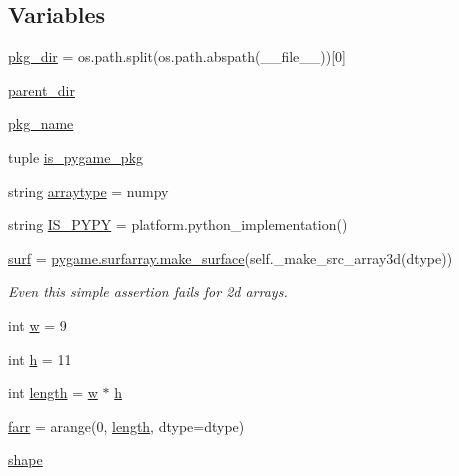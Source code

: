 \subsection*{Variables}
\begin{DoxyCompactItemize}
\item 
\hyperlink{namespacepygame_1_1tests_1_1surfarray__test_adb37bf20fd4938d254591decff569dee}{pkg\+\_\+dir} = os.\+path.\+split(os.\+path.\+abspath(\+\_\+\+\_\+file\+\_\+\+\_\+))\mbox{[}0\mbox{]}
\item 
\hyperlink{namespacepygame_1_1tests_1_1surfarray__test_a4ff8b0c51ce66b0d7e2a3e0508bb98e7}{parent\+\_\+dir}
\item 
\hyperlink{namespacepygame_1_1tests_1_1surfarray__test_af2ffcb3b8f8dffe4bc587a2fb8aa26a2}{pkg\+\_\+name}
\item 
tuple \hyperlink{namespacepygame_1_1tests_1_1surfarray__test_a2debc6de9160fbab950f9c0d4241558c}{is\+\_\+pygame\+\_\+pkg}
\item 
string \hyperlink{namespacepygame_1_1tests_1_1surfarray__test_ac5cfb951c1c17907359c9e65919a2854}{arraytype} = \textquotesingle{}numpy\textquotesingle{}
\item 
string \hyperlink{namespacepygame_1_1tests_1_1surfarray__test_af9daec8a99d357a0dd74c22a76a11816}{I\+S\+\_\+\+P\+Y\+PY} = platform.\+python\+\_\+implementation()
\item 
\hyperlink{namespacepygame_1_1tests_1_1surfarray__test_a9691668f5ffc1d3c0b6b68a135061f36}{surf} = \hyperlink{namespacepygame_1_1surfarray_a2e4d5099d42534776fd74076d289b250}{pygame.\+surfarray.\+make\+\_\+surface}(self.\+\_\+make\+\_\+src\+\_\+array3d(dtype))
\begin{DoxyCompactList}\small\item\em Even this simple assertion fails for 2d arrays. \end{DoxyCompactList}\item 
int \hyperlink{namespacepygame_1_1tests_1_1surfarray__test_af3c71573efea667ee8e3ddc53cb48217}{w} = 9
\item 
int \hyperlink{namespacepygame_1_1tests_1_1surfarray__test_a374fc21a7bfd92a6dc2352644167597d}{h} = 11
\item 
int \hyperlink{namespacepygame_1_1tests_1_1surfarray__test_ae4c9c44d41ff2302d59c285a8ac25127}{length} = \hyperlink{namespacepygame_1_1tests_1_1surfarray__test_af3c71573efea667ee8e3ddc53cb48217}{w} $\ast$ \hyperlink{namespacepygame_1_1tests_1_1surfarray__test_a374fc21a7bfd92a6dc2352644167597d}{h}
\item 
\hyperlink{namespacepygame_1_1tests_1_1surfarray__test_a14feeb891d2ad6de3c3e0461e97c846c}{farr} = arange(0, \hyperlink{namespacepygame_1_1tests_1_1surfarray__test_ae4c9c44d41ff2302d59c285a8ac25127}{length}, dtype=dtype)
\item 
\hyperlink{namespacepygame_1_1tests_1_1surfarray__test_a7c80667ec8c6297f43388370fdf508e1}{shape}
\end{DoxyCompactItemize}


